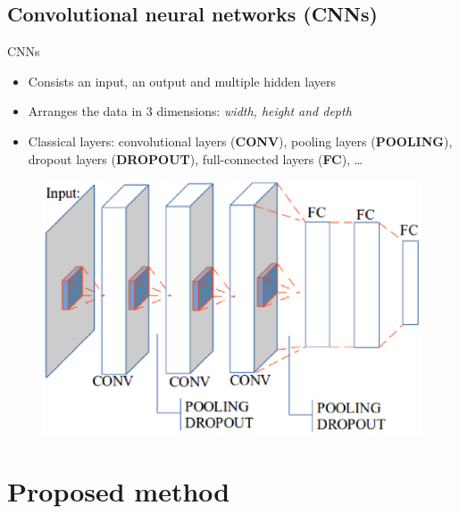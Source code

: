 \documentclass[10pt]{beamer}
\begin{document}
\subsection{Convolutional neural networks (CNNs)}
\begin{frame}{CNNs}
	\begin{itemize}
		\item Consists an input, an output and multiple hidden layers\footnotemark[1]
		\item Arranges the data in $3$ dimensions: \textit{width, height and depth}
		\item Classical layers: convolutional layers (\textbf{CONV}), pooling layers (\textbf{POOLING}), dropout layers (\textbf{DROPOUT}), full-connected layers (\textbf{FC}), \ldots
	\end{itemize}
	\begin{figure}[htbp]
  		\centering
   	 	\includegraphics[scale=.35]{images/convarc.eps}
	\end{figure}
\end{frame}
\section{Proposed method}
\end{document}

